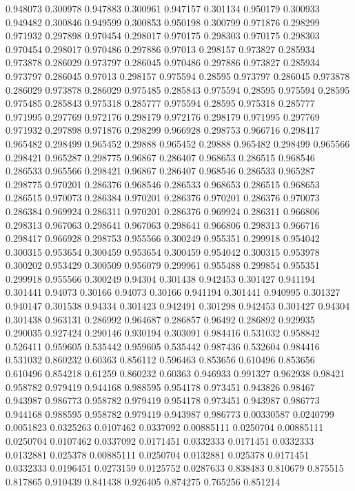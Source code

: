 0.948073 0.300978
0.947883 0.300961
0.947157 0.301134
0.950179 0.300933
0.949482 0.300846
0.949599 0.300853
0.950198 0.300799
0.971876 0.298299
0.971932 0.297898
0.970454 0.298017
0.970175 0.298303
0.970175 0.298303
0.970454 0.298017
0.970486 0.297886
0.97013 0.298157
0.973827 0.285934
0.973878 0.286029
0.973797 0.286045
0.970486 0.297886
0.973827 0.285934
0.973797 0.286045
0.97013 0.298157
0.975594 0.28595
0.973797 0.286045
0.973878 0.286029
0.973878 0.286029
0.975485 0.285843
0.975594 0.28595
0.975594 0.28595
0.975485 0.285843
0.975318 0.285777
0.975594 0.28595
0.975318 0.285777
0.971995 0.297769
0.972176 0.298179
0.972176 0.298179
0.971995 0.297769
0.971932 0.297898
0.971876 0.298299
0.966928 0.298753
0.966716 0.298417
0.965482 0.298499
0.965452 0.29888
0.965452 0.29888
0.965482 0.298499
0.965566 0.298421
0.965287 0.298775
0.96867 0.286407
0.968653 0.286515
0.968546 0.286533
0.965566 0.298421
0.96867 0.286407
0.968546 0.286533
0.965287 0.298775
0.970201 0.286376
0.968546 0.286533
0.968653 0.286515
0.968653 0.286515
0.970073 0.286384
0.970201 0.286376
0.970201 0.286376
0.970073 0.286384
0.969924 0.286311
0.970201 0.286376
0.969924 0.286311
0.966806 0.298313
0.967063 0.298641
0.967063 0.298641
0.966806 0.298313
0.966716 0.298417
0.966928 0.298753
0.955566 0.300249
0.955351 0.299918
0.954042 0.300315
0.953654 0.300459
0.953654 0.300459
0.954042 0.300315
0.953978 0.300202
0.953429 0.300509
0.956079 0.299961
0.955488 0.299854
0.955351 0.299918
0.955566 0.300249
0.94304 0.301438
0.942453 0.301427
0.941194 0.301441
0.94073 0.30166
0.94073 0.30166
0.941194 0.301441
0.940995 0.301327
0.940147 0.301538
0.94334 0.301423
0.942491 0.301298
0.942453 0.301427
0.94304 0.301438
0.963131 0.286992
0.964687 0.286857
0.96492 0.286892
0.929935 0.290035
0.927424 0.290146
0.930194 0.303091
0.984416 0.531032
0.958842 0.526411
0.959605 0.535442
0.959605 0.535442
0.987436 0.532604
0.984416 0.531032
0.860232 0.60363
0.856112 0.596463
0.853656 0.610496
0.853656 0.610496
0.854218 0.61259
0.860232 0.60363
0.946933 0.991327
0.962938 0.98421
0.958782 0.979419
0.944168 0.988595
0.954178 0.973451
0.943826 0.98467
0.943987 0.986773
0.958782 0.979419
0.954178 0.973451
0.943987 0.986773
0.944168 0.988595
0.958782 0.979419
0.943987 0.986773
0.00330587 0.0240799
0.0051823 0.0325263
0.0107462 0.0337092
0.00885111 0.0250704
0.00885111 0.0250704
0.0107462 0.0337092
0.0171451 0.0332333
0.0171451 0.0332333
0.0132881 0.025378
0.00885111 0.0250704
0.0132881 0.025378
0.0171451 0.0332333
0.0196451 0.0273159
0.0125752 0.0287633
0.838483 0.810679
0.875515 0.817865
0.910439 0.841438
0.926405 0.874275
0.765256 0.851214
